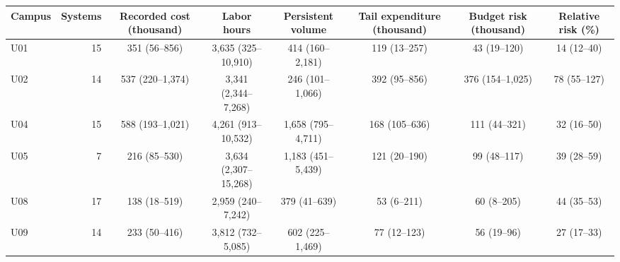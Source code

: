 \begin{tabular}{lrcccccc}
\toprule
Campus & Systems & Recorded cost (thousand) & Labor hours & Persistent volume & Tail expenditure (thousand) & Budget risk (thousand) & Relative risk (\%) \\
\midrule
U01 & 15 & 351 (56--856) & 3,635 (325--10,910) & 414 (160--2,181) & 119 (13--257) & 43 (19--120) & 14 (12--40) \\
U02 & 14 & 537 (220--1,374) & 3,341 (2,344--7,268) & 246 (101--1,066) & 392 (95--856) & 376 (154--1,025) & 78 (55--127) \\
U04 & 15 & 588 (193--1,021) & 4,261 (913--10,532) & 1,658 (795--4,711) & 168 (105--636) & 111 (44--321) & 32 (16--50) \\
U05 & 7 & 216 (85--530) & 3,634 (2,307--15,268) & 1,183 (451--5,439) & 121 (20--190) & 99 (48--117) & 39 (28--59) \\
U08 & 17 & 138 (18--519) & 2,959 (240--7,242) & 379 (41--639) & 53 (6--211) & 60 (8--205) & 44 (35--53) \\
U09 & 14 & 233 (50--416) & 3,812 (732--5,085) & 602 (225--1,469) & 77 (12--123) & 56 (19--96) & 27 (17--33) \\
\bottomrule
\end{tabular}
